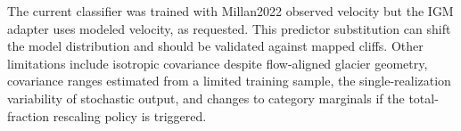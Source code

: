\documentclass[11pt,a4paper]{article}
\begin{document}
The current classifier was trained with Millan2022 observed velocity but the
IGM adapter uses modeled velocity, as requested. This predictor substitution
can shift the model distribution and should be validated against mapped cliffs.
Other limitations include isotropic covariance despite flow-aligned glacier
geometry, covariance ranges estimated from a limited training sample, the
single-realization variability of stochastic output, and changes to category
marginals if the total-fraction rescaling policy is triggered.
\end{document}
